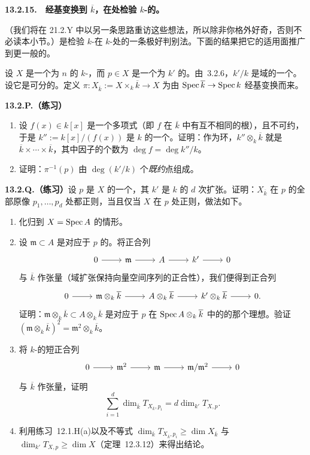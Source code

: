 \textbf{13.2.15.}\ \extrahard\ \textbf{经基变换到 $\overline{k}$，在\trClosedPoint{}处检验 $k$-\trScheme{}的\trRegularity。}

（我们将在 21.2.Y 中以另一条思路重访这些想法，所以除非你格外好奇，否则不必读本小节。）\trJacobianCriterion{}是检验\trFiniteType{} $k$-\trScheme{}在 $k$-\trValuedPoint{}处\trRegularity{}的一条极好判别法。下面的结果把它的适用面推广到更一般的\trClosedPoint。

设 $X$ 是一个\trPureDimension{}为 $n$ 的\trFiniteType{} $k$-\trScheme，而 $p\in X$ 是一个\trResidueField{}为 $k'$ 的\trClosedPoint。由\trNullstellensatz~3.2.6，$k'/k$ 是域的一个\trFiniteFieldExtension。设它是可分的。定义 $\pi\colon X_{\overline{k}}:=X\times_k\overline{k}\to X$ 为由 $\operatorname{Spec}\overline{k}\to\operatorname{Spec} k$ 经基变换而来。

\textbf{13.2.P.（练习）}
\begin{enumerate}[label=(\alph*)]
\item 设 $f(x)\in k[x]$ 是一个\trSeparable{}多项式（即 $f$ 在 $\overline{k}$ 中有互不相同的根），且不可约，于是 $k'':=k[x]/(f(x))$ 是 $k$ 的一个\trFieldExtension。证明：作为环，$k''\otimes_k\overline{k}$ 就是 $\overline{k}\times\cdots\times\overline{k}$，其中因子的个数为 $\deg f=\deg k''/k$。
\item 证明：$\pi^{-1}(p)$ 由 $\deg(k'/k)$ 个\emph{既约}点组成。
\end{enumerate}

\textbf{13.2.Q.（练习）}\quad 设 $p$ 是 $X$ 的一个\trClosedPoint，其\trResidueField{} $k'$ 是 $k$ 的 $d$ 次\trSeparable{}扩张。证明：$X_{\overline{k}}$ 在 $p$ 的全部原像 $p_1,\dots,p_d$ 处都正则，当且仅当 $X$ 在 $p$ 处正则，做法如下。
\begin{enumerate}[label=(\alph*)]
\item 化归到 $X=\operatorname{Spec} A$ 的情形。
\item 设 $\mathfrak{m}\subset A$ 是对应于 $p$ 的\trMaximalIdeal。将正合列
\[
\begin{tikzcd}
0 \ar[r] & \mathfrak{m} \ar[r] & A \ar[r] & k' \ar[r] & 0
\end{tikzcd}
\]
与 $\overline{k}$ 作张量（域扩张保持向量空间序列的正合性），我们便得到正合列
\[
\begin{tikzcd}
0 \ar[r] & \mathfrak{m}\otimes_k\overline{k} \ar[r] & A\otimes_k\overline{k} \ar[r] & k'\otimes_k\overline{k} \ar[r] & 0.
\end{tikzcd}
\]
证明：$\mathfrak{m}\otimes_k\overline{k}\subset A\otimes_k\overline{k}$ 是对应于 $p$ 在 $\operatorname{Spec} A\otimes_k\overline{k}$ 中的\trPullback{}的那个理想。验证 $(\mathfrak{m}\otimes_k\overline{k})^2=\mathfrak{m}^2\otimes_k\overline{k}$。
\item 将 $k$-\trVectorSpace{}的短正合列
\[
\begin{tikzcd}
0 \ar[r] & \mathfrak{m}^2 \ar[r] & \mathfrak{m} \ar[r] & \mathfrak{m}/\mathfrak{m}^2 \ar[r] & 0
\end{tikzcd}
\]
与 $\overline{k}$ 作张量，证明
\[
\sum_{i=1}^{d}\dim_{\overline{k}}T_{X_{\overline{k}},p_i}=d\dim_{k'}T_{X,p}.
\]
\item 利用\mbox{练习~12.1.H(a)}以及不等式 $\dim_{\overline{k}}T_{X_{\overline{k}},p_i}\ge\dim X_{\overline{k}}$ 与 $\dim_{k'}T_{X,p}\ge\dim X$（定理~12.3.12）来得出结论。
\end{enumerate}

